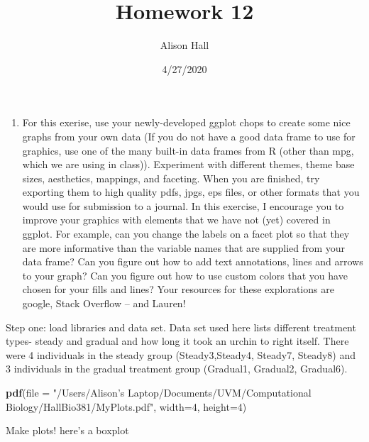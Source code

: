 \documentclass[
]{article}
\title{Homework 12}
\author{Alison Hall}
\date{4/27/2020}
\newenvironment{Shaded}{\begin{snugshade}}{\end{snugshade}}
\newcommand{\DataTypeTok}[1]{\textcolor[rgb]{0.13,0.29,0.53}{#1}}
\newcommand{\DecValTok}[1]{\textcolor[rgb]{0.00,0.00,0.81}{#1}}
\newcommand{\KeywordTok}[1]{\textcolor[rgb]{0.13,0.29,0.53}{\textbf{#1}}}
\newcommand{\NormalTok}[1]{#1}
\newcommand{\StringTok}[1]{\textcolor[rgb]{0.31,0.60,0.02}{#1}}
\providecommand{\tightlist}{%
  \setlength{\itemsep}{0pt}\setlength{\parskip}{0pt}}
\begin{document}
\maketitle

\begin{enumerate}
\def\labelenumi{\arabic{enumi}.}
\tightlist
\item
  For this exerise, use your newly-developed ggplot chops to create some
  nice graphs from your own data (If you do not have a good data frame
  to use for graphics, use one of the many built-in data frames from R
  (other than mpg, which we are using in class)). Experiment with
  different themes, theme base sizes, aesthetics, mappings, and
  faceting. When you are finished, try exporting them to high quality
  pdfs, jpgs, eps files, or other formats that you would use for
  submission to a journal. In this exercise, I encourage you to improve
  your graphics with elements that we have not (yet) covered in ggplot.
  For example, can you change the labels on a facet plot so that they
  are more informative than the variable names that are supplied from
  your data frame? Can you figure out how to add text annotations, lines
  and arrows to your graph? Can you figure out how to use custom colors
  that you have chosen for your fills and lines? Your resources for
  these explorations are google, Stack Overflow -- and Lauren!
\end{enumerate}

Step one: load libraries and data set. Data set used here lists
different treatment types- steady and gradual and how long it took an
urchin to right itself. There were 4 individuals in the steady group
(Steady3,Steady4, Steady7, Steady8) and 3 individuals in the gradual
treatment group (Gradual1, Gradual2, Gradual6).

\begin{Shaded}
\begin{Highlighting}[]
\KeywordTok{pdf}\NormalTok{(}\DataTypeTok{file =} \StringTok{"/Users/Alison's Laptop/Documents/UVM/Computational Biology/HallBio381/MyPlots.pdf"}\NormalTok{, }\DataTypeTok{width=}\DecValTok{4}\NormalTok{, }\DataTypeTok{height=}\DecValTok{4}\NormalTok{)}
\end{Highlighting}
\end{Shaded}

Make plots! here's a boxplot
\end{document}
